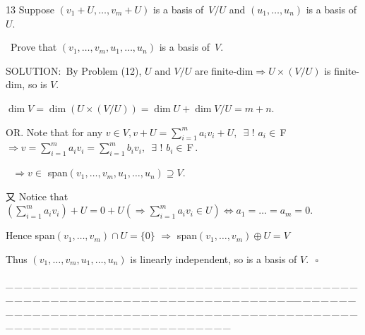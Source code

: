\documentclass[a4paper, 11pt, UTF8]{article}
\def\Fbf{$\,{\timesbf F}\,$}
\begin{document}
\begin{large}
{\timesbf\Large 13} {\timessl\Large 
Suppose $(v_1+U,\dots,v_m+U)$ is a basis of \,$V/U$ and $(u_1,\dots,u_n)$ is a basis of $U$.}\par\quad\,
{\timessl\Large Prove that $(v_1,\dots,v_m,u_1,\dots,u_n)$ is a basis of \,$V$.}\par
{\timesbf S\footnotesize{OLUTION:}}\,\,\,By Problem (12), $U$ and $V/U$ are finite-dim$\Rightarrow U\times(V/U)$ is finite-dim, so is $V$.\par\quad
$\dim V=\dim(U\times(V/U))=\dim U+\dim V/U=m+n.$\par\quad
{O{\small R}}. Note that for any $v\in V,v+U=\sum\limits_{i=1}^m a_i v_i+U,\,\,\,\exists\,\,!\,\,a_i\in\Fbf\Rightarrow v=\sum\limits_{i=1}^m a_i v_i=\sum\limits_{i=1}^m b_i v_i,\,\,\,\exists\,\,!\,\,b_i\in\Fbf.$\par\qquad\qquad\qquad\qquad\,\,
$\Rightarrow v\in$ span$(v_1,\dots,v_m,u_1,\dots,u_n)\supseteq V$.\par\quad
又 Notice that $(\sum\limits_{i=1}^m a_i v_i)+U=0+U(\Rightarrow\sum\limits_{i=1}^m a_i v_i\in U)\Longleftrightarrow a_1=\dots=a_m=0.$\par\quad
Hence span$(v_1,\dots,v_m)\cap U=\{0\}$
$\Rightarrow$ span$(v_1,\dots,v_m)\oplus U=V$\par\quad
Thus $(v_1,\dots,v_m,u_1,\dots,u_n)$ is linearly independent, so is a basis of $V.\,\,\,\,\square$\par
{\tiny \_\,\_\,\_\,\_\,\_\,\_\,\_\,\_\,\_\,\_\,\_\,\_\,\_\,\_\,\_\,\_\,\_\,\_\,\_\,\_\,\_\,\_\,\_\,\_\,\_\,\_\,\_\,\_\,\_\,\_\,\_\,\_\,\_\,\_\,\_\,\_\,\_\,\_\,\_\,\_\,\_\,\_\,\_\,\_\,\_\,\_\,\_\,\_\,\_\,\_\,\_\,\_\,\_\,\_\,\_\,\_\,\_\,\_\,\_\,\_\,\_\,\_\,\_\,\_\,\_\,\_\,\_\,\_\,\_\,\_\,\_\_\,\_\,\_\,\_\,\_\,\_\,\_\,\_\,\_\,\_\,\_\,\_\,\_\,\_\,\_\,\_\,\_\,\_\,\_\,\_\,\_\,\_\,\_\,\_\,\_\,\_\,\_\,\_\,\_\,\_\,\_\,\_\,\_\,\_\,\_\,\_\,\_\,\_\,\_\,\_\,\_\,\_\,\_\,\_\,\_\,\_\,\_\,\_\,\_\,\_\,\_\,\_\,\_\,\_\,\_\,\_\,\_\,\_\,\_\,\_\,\_\,\_\,\_\,\_\,\_\,\_\,\_\,\_\,\_\,\_\,\_}\par


\end{large}
\end{document}
